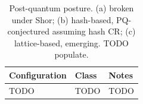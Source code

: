 \begin{table}[t]
  \centering
  \caption{Post-quantum posture. (a) broken under Shor; (b) hash-based,
    PQ-conjectured assuming hash CR; (c) lattice-based, emerging.
    TODO populate.}
  \label{tab:pq}
  \begin{tabularx}{\columnwidth}{lXX}
    \toprule
    Configuration & Class & Notes \\
    \midrule
    TODO & TODO & TODO \\
    \bottomrule
  \end{tabularx}
\end{table}

